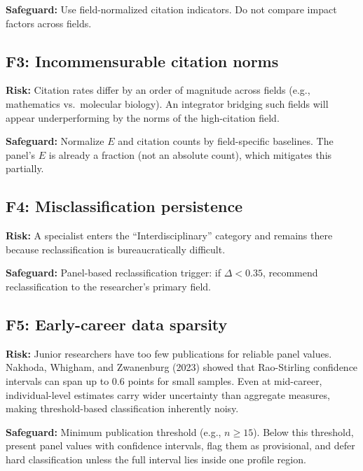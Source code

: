\documentclass[
]{article}
\begin{document}
\textbf{Safeguard:} Use field-normalized citation indicators. Do not
compare impact factors across fields.

\hypertarget{f3-incommensurable-citation-norms}{%
\subsection{F3: Incommensurable citation
norms}\label{f3-incommensurable-citation-norms}}

\textbf{Risk:} Citation rates differ by an order of magnitude across
fields (e.g., mathematics vs.~molecular biology). An integrator bridging
such fields will appear underperforming by the norms of the
high-citation field.

\textbf{Safeguard:} Normalize \(E\) and citation counts by
field-specific baselines. The panel's \(E\) is already a fraction (not
an absolute count), which mitigates this partially.

\hypertarget{f4-misclassification-persistence}{%
\subsection{F4: Misclassification
persistence}\label{f4-misclassification-persistence}}

\textbf{Risk:} A specialist enters the ``Interdisciplinary'' category
and remains there because reclassification is bureaucratically
difficult.

\textbf{Safeguard:} Panel-based reclassification trigger: if
\(\Delta < 0.35\), recommend reclassification to the researcher's
primary field.

\hypertarget{f5-early-career-data-sparsity}{%
\subsection{F5: Early-career data
sparsity}\label{f5-early-career-data-sparsity}}

\textbf{Risk:} Junior researchers have too few publications for reliable
panel values. Nakhoda, Whigham, and Zwanenburg (2023) showed that
Rao-Stirling confidence intervals can span up to 0.6 points for small
samples. Even at mid-career, individual-level estimates carry wider
uncertainty than aggregate measures, making threshold-based
classification inherently noisy.

\textbf{Safeguard:} Minimum publication threshold (e.g., \(n \geq 15\)).
Below this threshold, present panel values with confidence intervals,
flag them as provisional, and defer hard classification unless the full
interval lies inside one profile region.
\end{document}
